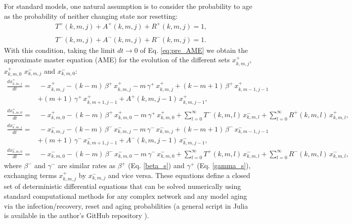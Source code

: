 For standard models, one natural assumption is to consider the probability to age as the probability of neither changing state nor resetting:
\begin{align} \label{cond_1}
    &  T^{+} (k,m,j) + A^{+} (k,m,j) + R^{+} (k,m,j) = 1, \nonumber\\
    \\
    &  T^{-} (k,m,j) + A^{-} (k,m,j) + R^{-} (k,m,j) = 1. \nonumber
    \end{align}
    With this condition, taking the limit $dt \to 0$ of Eq. \eqref{eq:pre_AME} we obtain the approximate master equation (AME) for the evolution of the different sets $x^{+}_{k,m,j}$, $x^{+}_{k,m,0}$ $x^{-}_{k,m,j}$ and $x^{-}_{k,m,0}$:
    \begin{align}
    \label{eq:AME}
        \frac{d x^{+}_{k,m,j}}{dt} = & \, - x^{+}_{k,m,j} - (k - m)\, \beta^{+}\,  x^{+}_{k,m,j} - m \, \gamma^{+}\, x^{+}_{k,m,j} + (k-m+1)\, \beta^{+} \,   x^{+}_{k,m-1,j-1} \nonumber\\
        & + (m+1)\, \gamma^{+} \,  x^{+}_{k,m+1,j-1} + A^{+} (k,m,j-1)\,  x^{+}_{k,m,j-1},  \nonumber\\
        \frac{d x^{+}_{k,m,0}}{dt}  = & \, - x^{+}_{k,m,0} - (k - m) \, \beta^{+}\,  x^{+}_{k,m,0} - m\, \gamma^{+} \,  x^{+}_{k,m,0} + \sum_{l = 0}^{\infty} T^{-} (k,m,l)\,  x^{-}_{k,m,l} + \sum_{l = 0}^{\infty} R^{+} (k,m,l)\, x^{+}_{k,m,l}, \nonumber \\
        \frac{d x^{-}_{k,m,j}}{dt}  = & \, - x^{-}_{k,m,j} - (k - m)\, \beta^{-}\,  x^{-}_{k,m,j} - m\, \gamma^{-} \,   x^{-}_{k,m,j} + (k-m+1)\, \beta^{-}\, x^{-}_{k,m-1,j-1} \\
        & + (m+1)\, \gamma^{-} \, x^{-}_{k,m+1,j-1} + A^{-} (k,m,j-1) \, x^{-}_{k,m,j-1},  \nonumber\\
        \frac{d x^{-}_{k,m,0}}{dt}  = & \,  - x^{-}_{k,m,0} - (k - m) \, \beta^{-}\,  x^{-}_{k,m,0} - m\,  \gamma^{-} \,  x^{-}_{k,m,0} + \sum_{l = 0}^{\infty} T^{+} (k,m,l) \, x^{-}_{k,m,l} + \sum_{l = 0}^{\infty} R^{-} (k,m,l) \, x^{-}_{k,m,l}, \nonumber
    \end{align}
    where $\beta^{-}$ and $\gamma^{-}$ are similar rates as $\beta^{+}$ (Eq. \eqref{beta_s}) and $\gamma^{+}$ (Eq. \eqref{gamma_s}), exchanging terms $x^{+}_{k,m,j}$ by $x^{-}_{k,m,j}$ and vice versa. These equations define a closed set of deterministic differential equations that can be solved numerically using standard computational methods for any complex network and any model aging via the infection/recovery, reset and aging probabilities (a general script in Julia is available in the author's GitHub repository \cite{link_git}).
    
